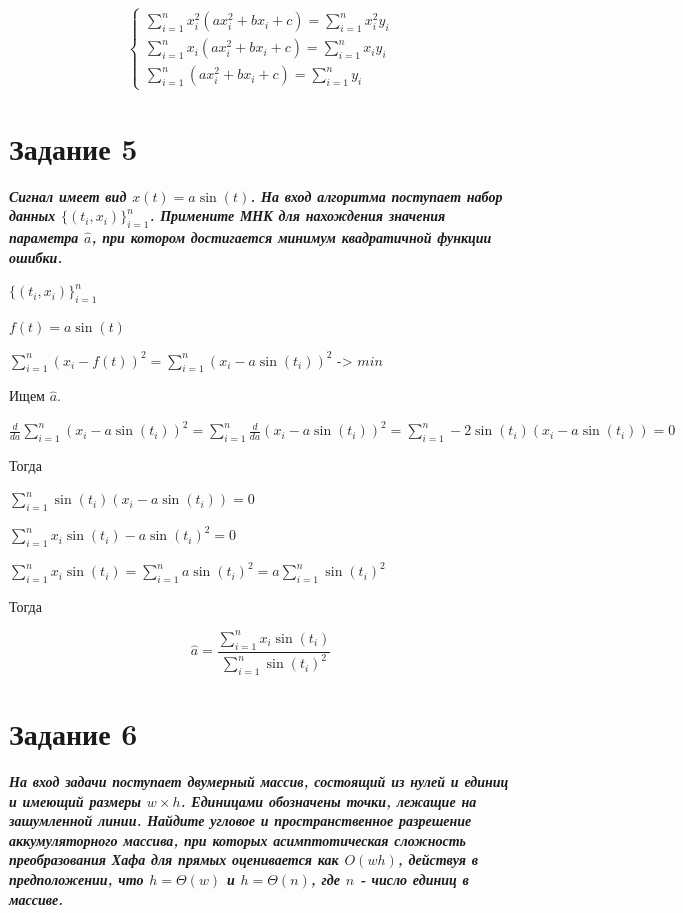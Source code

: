 \documentclass{article}
\begin{document}
\begin{equation}
\left\{
\begin{array}{l}
 \sum_{i=1}^n x_i^2(ax_i^2 + bx_i + c) = \sum_{i=1}^n x_i^2y_i  \\
\sum_{i=1}^n x_i(ax_i^2 + bx_i + c) = \sum_{i=1}^n x_iy_i \\
 \sum_{i=1}^n (ax_i^2 + bx_i + c) = \sum_{i=1}^n y_i
\end{array}
\right.
\end{equation}




\bigskip

\section*{\textbf{Задание 5}} \textbf{\textit{Сигнал имеет вид $x(t) = a \sin(t)$. На вход алгоритма поступает набор данных $\{ (t_i, x_i) \}_{i=1}^n$. Примените МНК для нахождения значения параметра $\hat{a}$, при котором достигается минимум квадратичной функции ошибки.}}

$\{ (t_i, x_i) \}_{i=1}^n$

$f(t) = a \sin(t)$

$\sum_{i=1}^n (x_i - f(t))^2 = \sum_{i=1}^n (x_i - a \sin(t_i))^2 $ -> $min$

Ищем $\hat{a}$.

$\frac{d}{da} \sum_{i=1}^n (x_i - a \sin(t_i))^2 = \sum_{i=1}^n \frac{d}{da}(x_i - a \sin(t_i))^2 = \sum_{i=1}^n -2\sin(t_i)(x_i - a \sin(t_i)) = 0$

Тогда

$\sum_{i=1}^n \sin(t_i)(x_i - a \sin(t_i)) = 0$

$\sum_{i=1}^n x_i\sin(t_i) - a \sin(t_i)^2 = 0$

$\sum_{i=1}^n x_i\sin(t_i) = \sum_{i=1}^n a \sin(t_i)^2 = a\sum_{i=1}^n \sin(t_i)^2$

Тогда 

$$\hat{a} = \frac{\sum_{i=1}^n x_i\sin(t_i)}{\sum_{i=1}^n \sin(t_i)^2}$$

\bigskip

\section*{\textbf{Задание 6}} \textbf{\textit{На вход задачи поступает двумерный массив, состоящий из нулей и единиц и имеющий размеры $w \times h$. Единицами обозначены точки, лежащие на зашумленной линии. Найдите угловое и пространственное разрешение аккумуляторного массива, при которых асимптотическая сложность преобразования Хафа для прямых оценивается как $O(wh)$, действуя в предположении, что $h = \Theta(w)$ и $h = \Theta(n)$, где $n$ - число единиц в массиве.}}
\end{document}
